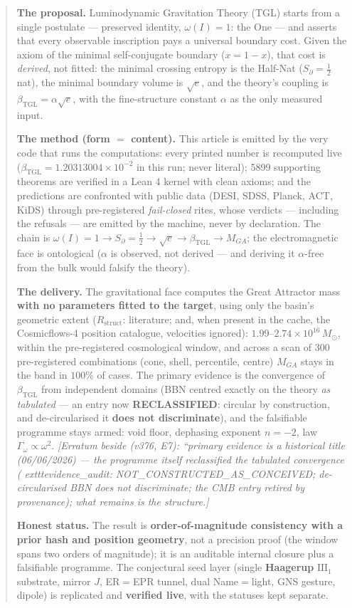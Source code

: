 \documentclass[11pt]{article}
\newcommand{\bTGL}{\beta_{\mathrm{TGL}}}\newcommand{\Msun}{M_{\odot}}\newcommand{\TGL}{\mathrm{TGL}}
\theoremstyle{definition}\newtheorem{deriv}{Derivation}
\begin{document}
\begin{abstract}

\textbf{The proposal.} Luminodynamic Gravitation Theory (TGL) starts from a single postulate --- preserved identity, $\omega(I)=1$: the One --- and asserts that every observable inscription pays a universal boundary cost. Given the axiom of the minimal self-conjugate boundary ($x=1-x$), that cost is \emph{derived}, not fitted: the minimal crossing entropy is the Half-Nat ($S_\partial=\tfrac12$ nat), the minimal boundary volume is $\sqrt e$, and the theory's coupling is $\bTGL=\alpha\sqrt e$, with the fine-structure constant $\alpha$ as the only measured input.

\textbf{The method (form $=$ content).} This article is emitted by the very code that runs the computations: every printed number is recomputed live ($\bTGL=1.20313004\times10^{-2}$ in this run; never literal); 5899 supporting theorems are verified in a Lean 4 kernel with clean axioms; and the predictions are confronted with public data (DESI, SDSS, Planck, ACT, KiDS) through pre-registered \emph{fail-closed} rites, whose verdicts --- including the refusals --- are emitted by the machine, never by declaration. The chain is $\omega(I)=1\to S_\partial=\tfrac12\to\sqrt e\to\bTGL\to M_{GA}$; the electromagnetic face is ontological ($\alpha$ is observed, not derived --- and deriving it $\alpha$-free from the bulk would falsify the theory).

\textbf{The delivery.} The gravitational face computes the Great Attractor mass \textbf{with no parameters fitted to the target}, using only the basin's geometric extent ($R_{\mathrm{struct}}$: literature; and, when present in the cache, the Cosmicflows-4 position catalogue, velocities ignored): $1.99$--$2.74\times10^{16}\,\Msun$, within the pre-registered cosmological window, and across a scan of $300$ pre-registered combinations (cone, shell, percentile, centre) $M_{GA}$ stays in the band in $100\%$ of cases. The primary evidence is the convergence of $\bTGL$ from independent domains (BBN centred exactly on the theory \emph{as tabulated} --- an entry now \textbf{RECLASSIFIED}: circular by construction, and de-circularised it \textbf{does not discriminate}), and the falsifiable programme stays armed: void floor, dephasing exponent $n=-2$, law $\Gamma_\omega\propto\omega^2$. \emph{[Erratum beside (v376, E7): ``primary evidence is a historical title (06/06/2026) --- the programme itself reclassified the tabulated convergence (	exttt{evidence\_audit}: NOT\_CONSTRUCTED\_AS\_CONCEIVED; de-circularised BBN does not discriminate; the CMB entry retired by provenance); what remains is the structure.]}

\textbf{Honest status.} The result is \textbf{order-of-magnitude consistency with a prior hash and position geometry}, not a precision proof (the window spans two orders of magnitude); it is an auditable internal closure plus a falsifiable programme. The conjectural seed layer (single \textbf{Haagerup} $\mathrm{III}_1$ substrate, mirror $J$, ER$=$EPR tunnel, dual Name$=$light, GNS gesture, dipole) is replicated and \textbf{verified live}, with the statuses kept separate.

\end{abstract}
\end{document}
